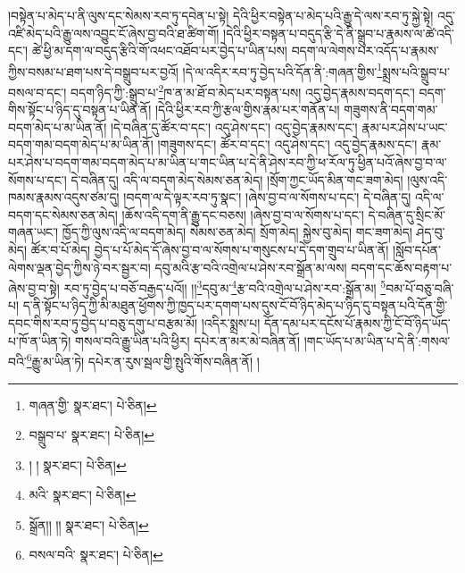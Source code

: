 །བསྟེན་པ་མེད་པ་ནི་ལུས་དང་སེམས་རབ་ཏུ་དབེན་པ་སྟེ། དེའི་ཕྱིར་བསྟེན་པ་མེད་པའི་རྒྱུ་དེ་ལས་རབ་ཏུ་སྐྱེ་སྟེ། འདུ་འཛི་མེད་པའི་རྒྱུ་ལས་འབྱུང་ངོ་ཞེས་བྱ་བའི་ཐ་ཚིག་གོ། །དེའི་ཕྱིར་བསྟན་པ་བདུད་རྩི་དེ་ནི་སྒྲུབ་པ་རྣམས་ལ་ཚེ་འདི་དང་། ཚེ་ཕྱི་མ་དག་ལ་བདུད་རྩིའི་གོ་འཕང་འཐོབ་པར་བྱེད་པ་ཡིན་པས། བདག་ལ་ལེགས་པར་འདོད་པ་རྣམས་ཀྱིས་བསམ་པ་ཐག་པས་དེ་བསྒྲུབ་པར་བྱའོ། །དེ་ལ་འདིར་རབ་ཏུ་བྱེད་པའི་དོན་ནི་:གཞན་གྱིས་\footnote{གཞན་གྱི་  སྣར་ཐང་།  པེ་ཅིན། }སྨྲས་པའི་སྒྲུབ་པ་བསལ་བ་དང་། བདག་ཉིད་ཀྱི་:སྒྲུབ་པ་\footnote{བསྒྲུབ་པ་  སྣར་ཐང་།  པེ་ཅིན། }ཁ་ན་མ་ཐོ་བ་མེད་པར་བསྟན་པས། འདུ་བྱེད་རྣམས་བདག་དང་། བདག་གིས་སྟོང་པ་ཉིད་དུ་བསྟན་པ་ཡིན་ནོ། །དེའི་ཕྱིར་རབ་ཀྱི་རྩལ་གྱིས་རྣམ་པར་གནོན་པ། གཟུགས་ནི་བདག་གམ་བདག་མེད་པ་མ་ཡིན་ནོ། །དེ་བཞིན་དུ་ཚོར་བ་དང་། འདུ་ཤེས་དང་། འདུ་བྱེད་རྣམས་དང་། རྣམ་པར་ཤེས་པ་ཡང་བདག་གམ་བདག་མེད་པ་མ་ཡིན་ནོ། །གཟུགས་དང་། ཚོར་བ་དང་། འདུ་ཤེས་དང་། འདུ་བྱེད་རྣམས་དང་། རྣམ་པར་ཤེས་པ་བདག་གམ་བདག་མེད་པ་མ་ཡིན་པ་གང་ཡིན་པ་དེ་ནི་ཤེས་རབ་ཀྱི་ཕ་རོལ་ཏུ་ཕྱིན་པའོ་ཞེས་བྱ་བ་ལ་སོགས་པ་དང་། དེ་བཞིན་དུ། འདི་ལ་བདག་མེད་སེམས་ཅན་མེད། །སྲོག་ཀྱང་ཡོད་མིན་གང་ཟག་མེད། །ལུས་འདི་ཁམས་རྣམས་འདུས་ཙམ་དུ། །བདག་ལ་དེ་ལྟར་རབ་ཏུ་སྣང་། །ཞེས་བྱ་བ་ལ་སོགས་པ་དང་། དེ་བཞིན་དུ། འདི་ལ་བདག་དང་སེམས་ཅན་མེད། །ཆོས་འདི་དག་ནི་རྒྱུ་དང་བཅས། །ཞེས་བྱ་བ་ལ་སོགས་པ་དང་། དེ་བཞིན་དུ་སྲིང་མོ་གཞན་ཡང་། ཁྱོད་ཀྱི་ལུས་འདི་ལ་བདག་མེད། སེམས་ཅན་མེད། སྲོག་མེད། སྐྱེས་བུ་མེད། གང་ཟག་མེད། ཤེད་བུ་མེད། ཚོར་བ་པོ་མེད། བྱེད་པ་པོ་མེད་དོ་ཞེས་བྱ་བ་ལ་སོགས་པ་གསུངས་པ་དེ་དག་གྲུབ་པ་ཡིན་ནོ། །སློབ་དཔོན་ལེགས་ལྡན་བྱེད་ཀྱིས་ཉེ་བར་སྦྱར་བ། དབུ་མའི་རྩ་བའི་འགྲེལ་པ་ཤེས་རབ་སྒྲོན་མ་ལས། བདག་དང་ཆོས་བརྟག་པ་ཞེས་བྱ་བ་སྟེ། རབ་ཏུ་བྱེད་པ་བཅོ་བརྒྱད་པའོ།། །།\footnote{། །  སྣར་ཐང་།  པེ་ཅིན། }དབུ་མ་\footnote{མའི་  སྣར་ཐང་།  པེ་ཅིན། }རྩ་བའི་འགྲེལ་པ་ཤེས་རབ་:སྒྲོན་མ། \footnote{སྒྲོན།། །།   སྣར་ཐང་།  པེ་ཅིན། }བམ་པོ་བཅུ་བཞི་པ། ད་ནི་སྟོང་པ་ཉིད་ཀྱི་མི་མཐུན་ཕྱོགས་ཀྱི་ཁྱད་པར་དགག་པས་དུས་ངོ་བོ་ཉིད་མེད་པ་ཉིད་དུ་བསྟན་པའི་དོན་གྱི་དབང་གིས་རབ་ཏུ་བྱེད་པ་བཅུ་དགུ་པ་བརྩམ་མོ། །འདིར་སྨྲས་པ། དོན་དམ་པར་དངོས་པོ་རྣམས་ཀྱི་ངོ་བོ་ཉིད་ཡོད་པ་ཁོ་ན་ཡིན་ཏེ། གསལ་བའི་རྒྱུ་ཡིན་པའི་ཕྱིར། དཔེར་ན་མར་མེ་བཞིན་ནོ། །གང་ཡོད་པ་མ་ཡིན་པ་དེ་ནི་:གསལ་བའི་\footnote{བསལ་བའི་  སྣར་ཐང་།  པེ་ཅིན། }རྒྱུ་མ་ཡིན་ཏེ། དཔེར་ན་རུས་སྦལ་གྱི་སྤུའི་གོས་བཞིན་ནོ། །
